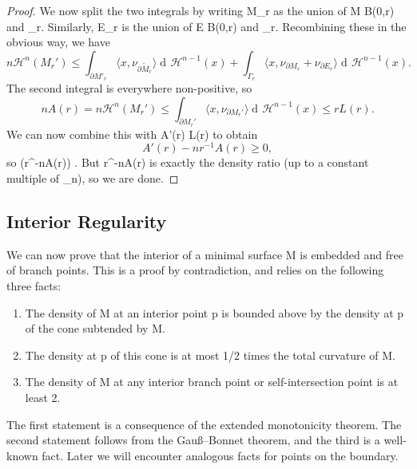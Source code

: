 \documentclass[a4paper, 11pt]{article}
\theoremstyle{plain}
\theoremstyle{definition}
\theoremstyle{remark}
\DeclareMathOperator{\diff}{d \!}
\numberwithin{equation}{subsection}
\def\({}
\def\){}
\def\pi{}
\begin{document}
\begin{proof}
We now split the two integrals by writing \(\partial M_{r}\) as the union of \(M \cap \partial B(0,r)\) and \(\Gamma_{r}\). Similarly, \(\partial E_{r}\) is the union of \(E \cap \partial B(0,r)\) and \(\Gamma_{r}\). Recombining these in the obvious way, we have
\begin{equation}
n \mathcal{H}^{n}(M_{r}') \leqslant \int_{\partial M'_{r}} \langle x, \nu_{\partial \tilde{M}_{r}} \rangle \diff \mathcal{H}^{n-1}(x) + \int_{\Gamma_{r}} \langle x, \nu_{\partial M_{r}} + \nu_{\partial E_{r}} \rangle \diff \mathcal{H}^{n-1}(x).
\end{equation}
The second integral is everywhere non-positive, so
\begin{equation}
nA(r) = n \mathcal{H}^{n}(M_{r}') \leqslant \int_{\partial M_{r}'} \langle x, \nu_{\partial M_{r}'} \rangle \diff \mathcal{H}^{n-1}(x) \leqslant rL(r).
\end{equation}
We can now combine this with \(A'(r) \geqslant L(r)\) to obtain
\begin{equation}
A'(r) - nr^{-1}A(r) \geqslant 0,
\end{equation}
so \(\frac{\!\diff}{\diff r} (r^{-n}A(r)) \). But \(r^{-n}A(r)\) is exactly the density ratio (up to a constant multiple of \(\omega_{n}\)), so we are done.
\end{proof}


\subsection{Interior Regularity}

We can now prove that the interior of a minimal surface \(M\) is embedded and free of branch points. This is a proof by contradiction, and relies on the following three facts:
\begin{enumerate}
\item The density of \(M\) at an interior point \(p\) is bounded above by the density at \(p\) of the cone subtended by \(\partial M\).
\item The density at \(p\) of this cone is at most \(1/2\pi\) times the total curvature of \(\partial M\).
\item The density of \(M\) at any interior branch point or self-intersection point is at least \(2\).
\end{enumerate}
The first statement is a consequence of the extended monotonicity theorem. The second statement follows from the Gau\ss --Bonnet theorem, and the third is a well-known fact. Later we will encounter analogous facts for points on the boundary.
\end{document}
